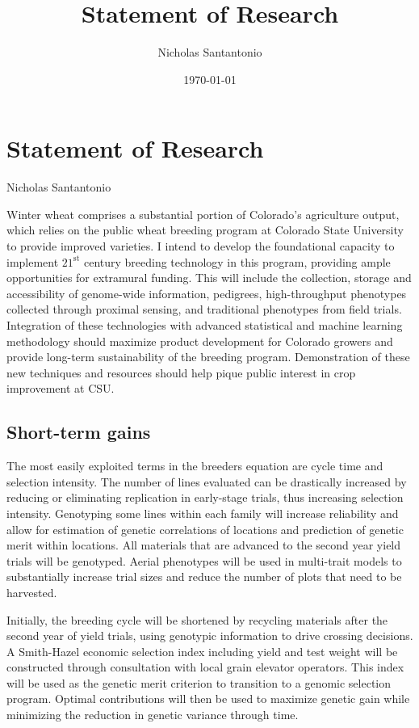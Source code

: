 \documentclass[11pt]{article}
\title{Statement of Research}
\author{Nicholas Santantonio}
\date{\today}
\begin{document}
\section*{\centering Statement of Research}
\begin{center} Nicholas Santantonio \end{center}


\noindent Winter wheat comprises a substantial portion of Colorado's agriculture output, which relies on the public wheat breeding program at Colorado State University to provide improved varieties. I intend to develop the foundational capacity to implement $21^\text{st}$ century breeding technology in this program, providing ample opportunities for extramural funding. This will include the collection, storage and accessibility of genome-wide information, pedigrees, high-throughput phenotypes collected through proximal sensing, and traditional phenotypes from field trials. Integration of these technologies with advanced statistical and machine learning methodology should maximize product development for Colorado growers and provide long-term sustainability of the breeding program. Demonstration of these new techniques and resources should help pique public interest in crop improvement at CSU.  

\subsection*{Short-term gains}

The most easily exploited terms in the breeders equation are cycle time and selection intensity. The number of lines evaluated can be drastically increased by reducing or eliminating replication in early-stage trials, thus increasing selection intensity. Genotyping some lines within each family will increase reliability and allow for estimation of genetic correlations of locations and prediction of genetic merit within locations. All materials that are advanced to the second year yield trials will be genotyped. Aerial phenotypes will be used in multi-trait models to substantially increase trial sizes and reduce the number of plots that need to be harvested. %

Initially, the breeding cycle will be shortened by recycling materials after the second year of yield trials, using genotypic information to drive crossing decisions. A Smith-Hazel economic selection index including yield and test weight will be constructed through consultation with local grain elevator operators. This index will be used as the genetic merit criterion to transition to a genomic selection program. Optimal contributions will then be used to maximize genetic gain while minimizing the reduction in genetic variance through time. 
\end{document}
